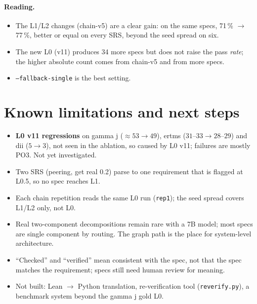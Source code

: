 \documentclass[11pt,a4paper]{article}
\newcommand{\code}[1]{\texttt{#1}}
\newcommand{\file}[1]{\texttt{#1}}
\begin{document}
\paragraph{Reading.}
\begin{itemize}
  \item The L1/L2 changes (chain-v5) are a clear gain: on the same specs, 71\,\% $\to$ 77\,\%,
        better or equal on every SRS, beyond the seed spread on six.
  \item The new L0 (v11) produces 34 more specs but does not raise the pass \emph{rate}; the
        higher absolute count comes from chain-v5 and from more specs.
  \item \code{--fallback-single} is the best setting.
\end{itemize}

\section{Known limitations and next steps}
\begin{itemize}
  \item \textbf{L0 v11 regressions} on gamma j ($\approx 53 \to 49$), ertms ($31$--$33 \to 28$--$29$)
        and dii ($5 \to 3$), not seen in the ablation, so caused by L0 v11; failures are mostly PO3.
        Not yet investigated.
  \item Two SRS (peering, get real 0.2) parse to one requirement that is flagged at L0.5, so no
        spec reaches L1.
  \item Each chain repetition reads the same L0 run (\code{rep1}); the seed spread covers L1/L2
        only, not L0.
  \item Real two-component decompositions remain rare with a 7B model; most specs are single
        component by routing. The graph path is the place for system-level architecture.
  \item ``Checked'' and ``verified'' mean consistent with the spec, not that the spec matches
        the requirement; specs still need human review for meaning.
  \item Not built: Lean $\to$ Python translation, re-verification tool (\file{reverify.py}), a
        benchmark system beyond the gamma j gold L0.
\end{itemize}

\appendix
\end{document}
